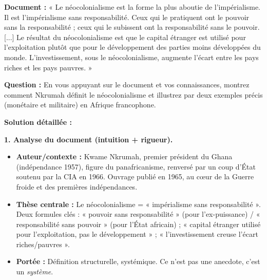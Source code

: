 \documentclass[11pt]{article}
\begin{document}
\begin{exoresolu}
\textbf{Document :} « Le néocolonialisme est la forme la plus aboutie de l'impérialisme. Il est l'impérialisme sans responsabilité. Ceux qui le pratiquent ont le pouvoir sans la responsabilité ; ceux qui le subissent ont la responsabilité sans le pouvoir. [...] Le résultat du néocolonialisme est que le capital étranger est utilisé pour l'exploitation plutôt que pour le développement des parties moins développées du monde. L'investissement, sous le néocolonialisme, augmente l'écart entre les pays riches et les pays pauvres. »

\textbf{Question :} En vous appuyant sur le document et vos connaissances, montrez comment Nkrumah définit le néocolonialisme et illustrez par deux exemples précis (monétaire et militaire) en Afrique francophone.

\tcblower

\textbf{Solution détaillée :}

\textbf{1. Analyse du document (intuition + rigueur).}
\begin{itemize}
    \item \textbf{Auteur/contexte :} Kwame Nkrumah, premier président du Ghana (indépendance 1957), figure du panafricanisme, renversé par un coup d'État soutenu par la CIA en 1966. Ouvrage publié en 1965, au cœur de la Guerre froide et des premières indépendances.
    \item \textbf{Thèse centrale :} Le néocolonialisme = « impérialisme sans responsabilité ». Deux formules clés : « pouvoir sans responsabilité » (pour l'ex-puissance) / « responsabilité sans pouvoir » (pour l'État africain) ; « capital étranger utilisé pour l'exploitation, pas le développement » ; « l'investissement creuse l'écart riches/pauvres ».
    \item \textbf{Portée :} Définition structurelle, systémique. Ce n'est pas une anecdote, c'est un \emph{système}.
\end{itemize}


\end{exoresolu}
\end{document}
